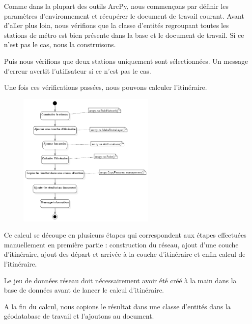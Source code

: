 \documentclass[11pt]{article}
\begin{document}
Comme dans la plupart des outils ArcPy, nous commençons par définir les paramètres d'environnement et récupérer le document de travail courant. Avant d'aller plus loin, nous vérifions que la classe d'entités regroupant toutes les stations de métro est bien présente dans la base et le document de travail. Si ce n'est pas le cas, nous la construisons.

Puis nous vérifions que deux stations uniquement sont sélectionnées. Un message d'erreur avertit l'utilisateur si ce n'est pas le cas.

Une fois ces vérifications passées, nous pouvons calculer l'itinéraire.

\begin{figure}[H]
	\center \includegraphics[width=0.6\textwidth]{img/td3b/diagramme_activite_calcul_itineraire.png} \\
\end{figure}

Ce calcul se découpe en plusieurs étapes qui correspondent aux étapes effectuées manuellement en première partie : construction du réseau, ajout d'une couche d'itinéraire, ajout des départ et arrivée à la couche d'itinéraire et enfin calcul de l'itinéraire. 

Le jeu de données réseau doit nécessairement avoir été créé à la main dans la base de données avant de lancer le calcul d'itinéraire.

A la fin du calcul, nous copions le résultat dans une classe d'entités dans la géodatabase de travail et l'ajoutons au document.
\end{document}
